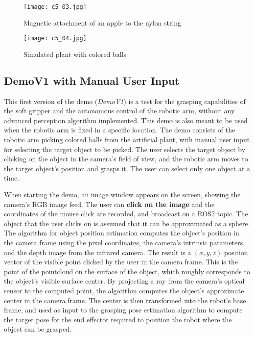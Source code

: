 \begin{figure}[t]
    \centering
    \texttt{[image: c5\_03.jpg]}
    \caption{Magnetic attachment of an apple to the nylon string}
    \label{fig:magnetic}
\end{figure}

\begin{figure}[t]
    \centering
    \texttt{[image: c5\_04.jpg]}
    \caption{Simulated plant with colored balls}
    \label{fig:sim_plant}
\end{figure}



\subsection{DemoV1 with Manual User Input}

This first version of the demo (\textit{DemoV1}) is a test for the grasping capabilities of the soft gripper and
the autonomous control of the robotic arm, without any advanced perception algorithm implemented. 
This demo is also meant to be used when the robotic arm is fixed in a specific location. The demo consists of
the robotic arm picking colored balls from the artificial plant, with manual user input for selecting the target
object to be picked. The user selects the target object by clicking on the object in the camera's field of view,
and the robotic arm moves to the target object's position and grasps it. The user can select only one object at 
a time.

When starting the demo, an image window appears on the screen, showing the camera's RGB image feed.
The user can \textbf{click on the image} and the coordinates of the mouse click are recorded, and broadcast on a ROS2
topic. The object that the user clicks on is assumed that it can be approximated as a sphere.
The algorithm for object position estimation computes the object's position in the camera frame
using the pixel coordinates, the camera's intrinsic parameters, and the depth image from the infrared camera.
The result is a $(x, y, z)$ position vector of the visible point clicked by the user in the camera frame. 
This is the point of the pointcloud on the surface of the object, which roughly corresponds to the 
object's visible surface center. By projecting a ray from the camera's optical sensor to the computed point,
the algorithm computes the object's approximate center in the camera frame. The center is then transformed
into the robot's base frame, and used as input to the grasping pose estimation algorithm to compute the target pose
for the end effector required to position the robot where the object can be grasped.


